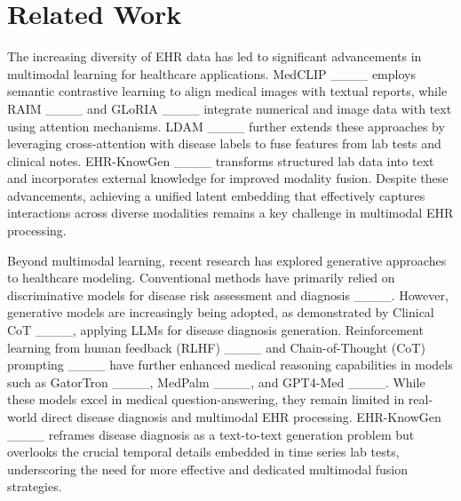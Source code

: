 \section{Related Work}
The increasing diversity of EHR data has led to significant advancements in multimodal learning for healthcare applications. MedCLIP ____ employs semantic contrastive learning to align medical images with textual reports, while RAIM ____ and GLoRIA ____ integrate numerical and image data with text using attention mechanisms. LDAM ____ further extends these approaches by leveraging cross-attention with disease labels to fuse features from lab tests and clinical notes. EHR-KnowGen ____ transforms structured lab data into text and incorporates external knowledge for improved modality fusion. Despite these advancements, achieving a unified latent embedding that effectively captures interactions across diverse modalities remains a key challenge in multimodal EHR processing.

Beyond multimodal learning, recent research has explored generative approaches to healthcare modeling. Conventional methods have primarily relied on discriminative models for disease risk assessment and diagnosis ____. However, generative models are increasingly being adopted, as demonstrated by Clinical CoT ____, applying LLMs for disease diagnosis generation. Reinforcement learning from human feedback (RLHF) ____ and Chain-of-Thought (CoT) prompting ____ have further enhanced medical reasoning capabilities in models such as GatorTron ____, MedPalm ____, and GPT4-Med ____. While these models excel in medical question-answering, they remain limited in real-world direct disease diagnosis and multimodal EHR processing. EHR-KnowGen ____ reframes disease diagnosis as a text-to-text generation problem but overlooks the crucial temporal details embedded in time series lab tests, underscoring the need for more effective and dedicated multimodal fusion strategies.

%